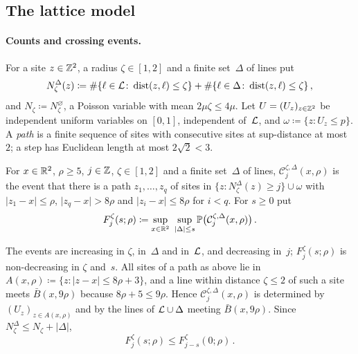 \documentclass[11pt,letterpaper]{article}
\DeclareMathOperator{\dist}{dist}
\newcommand{\cC}{\mathcal C}
\begin{document}
\subsection{The lattice model}
\label{sub:sec:setting}

\paragraph{Counts and crossing events.} For a site $z\in\mathbb Z^2$, a radius $\zeta\in[1,2]$ and a finite set~$\Delta$ of lines put
\begin{equation*}
  N_\zeta^{\Delta}(z)\coloneqq\#\{\ell\in\cL\colon\dist(z,\ell)\le \zeta\}+\#\{\ell\in\Delta\colon\dist(z,\ell)\le \zeta\}\,,
\end{equation*}
and $N_\zeta\coloneqq N_\zeta^\varnothing$, a Poisson variable with mean $2\mu \zeta\le4\mu$. Let $U=(U_z)_{z\in\mathbb Z^2}$ be independent uniform variables on $[0,1]$, independent of~$\mathcal L$, and $\omega\coloneqq\{z\colon U_z\le p\}$. A \emph{path} is a finite sequence of sites with consecutive sites at sup-distance at most~$2$; a step has Euclidean length at most $2\sqrt2<3$.

\begin{definition}
\label{sub:def:G}
For $x\in\mathbb R^2$, $\rho\ge5$, $j\in\mathbb Z$, $\zeta\in[1,2]$ and a finite set~$\Delta$ of lines, $\cC_j^{\zeta,\Delta}(x,\rho)$ is the event that there is a path $z_1,\dots,z_q$ of sites in $\{z\colon N_\zeta^\Delta(z)\ge j\}\cup\omega$ with $\lvert z_1-x\rvert\le\rho$, $\lvert z_q-x\rvert>8\rho$ and $\lvert z_i-x\rvert\le8\rho$ for $i<q$. For $s\ge0$ put
\begin{equation*}
  F_j^\zeta(s;\rho)\coloneqq\sup_{x\in\R^2}\ \sup_{\lvert\Delta\rvert\le s}\P\bigl(\cC_j^{\zeta,\Delta}(x,\rho)\bigr)\,.
\end{equation*}
\end{definition}

The events are increasing in $\zeta$, in~$\Delta$ and in~$\mathcal L$, and decreasing in~$j$; $F_j^\zeta(s;\rho)$ is non-decreasing in $\zeta$ and~$s$. All sites of a path as above lie in $A(x,\rho)\coloneqq\{z\colon\lvert z-x\rvert\le8\rho+3\}$, and a line within distance $\zeta\le2$ of such a site meets $\bar B(x,9\rho)$ because $8\rho+5\le9\rho$. Hence $\cC_j^{\zeta,\Delta}(x,\rho)$ is determined by $(U_z)_{z\in A(x,\rho)}$ and by the lines of $\mathcal L\cup\Delta$ meeting $\bar B(x,9\rho)$. Since $N_\zeta^\Delta\le N_\zeta+\lvert\Delta\rvert$,
\begin{equation}
\label{sub:eq:trivial}
  F_j^\zeta(s;\rho)\le F^\zeta_{j-s}(0;\rho)\,.
\end{equation}
\end{document}
